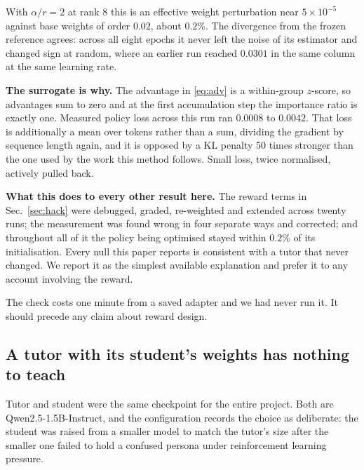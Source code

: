 With $\alpha/r = 2$ at rank 8 this is an effective weight perturbation near
$5\times10^{-5}$ against base weights of order $0.02$, about $0.2\%$. The
divergence from the frozen reference agrees: across all eight epochs it never
left the noise of its estimator and changed sign at random, where an earlier
run reached $0.0301$ in the same column at the same learning rate.

\textbf{The surrogate is why.} The advantage in \eqref{eq:adv} is a
within-group $z$-score, so advantages sum to zero and at the first
accumulation step the importance ratio is exactly one. Measured policy loss
across this run ran $0.0008$ to $0.0042$. That loss is additionally a mean over
tokens rather than a sum, dividing the gradient by sequence length again, and
it is opposed by a KL penalty 50 times stronger than the one used by the work
this method follows. Small loss, twice normalised, actively pulled back.

\textbf{What this does to every other result here.} The reward terms in
Sec.~\ref{sec:hack} were debugged, graded, re-weighted and extended across
twenty runs; the measurement was found wrong in four separate ways and
corrected; and throughout all of it the policy being optimised stayed within
$0.2\%$ of its initialisation. Every null this paper reports is consistent with
a tutor that never changed. We report it as the simplest available explanation
and prefer it to any account involving the reward.

The check costs one minute from a saved adapter and we had never run it. It
should precede any claim about reward design.


\subsection{A tutor with its student's weights has nothing to teach}
\label{sec:asymmetry}

Tutor and student were the same checkpoint for the entire project. Both are
Qwen2.5-1.5B-Instruct, and the configuration records the choice as deliberate:
the student was raised from a smaller model to match the tutor's size after the
smaller one failed to hold a confused persona under reinforcement learning
pressure.

